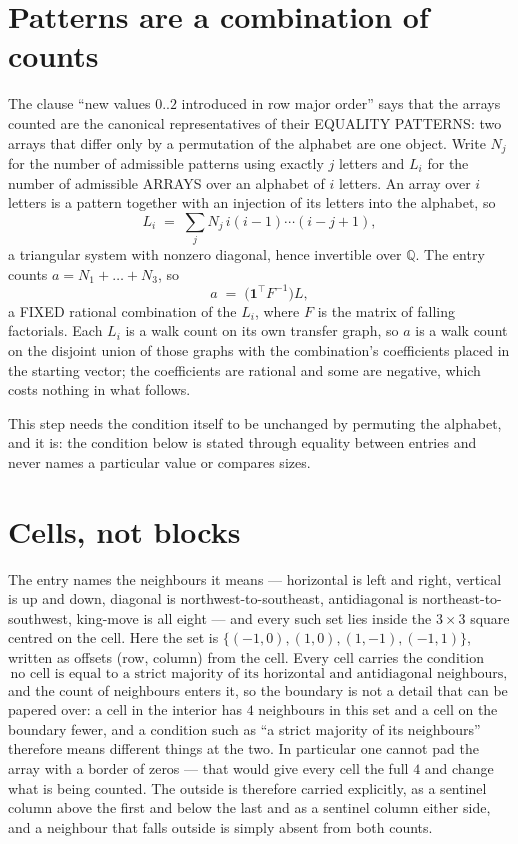 \documentclass[11pt,a4paper]{article}
\theoremstyle{plain}
\theoremstyle{definition}
\begin{document}
\section{Patterns are a combination of counts}

The clause ``new values $0..2$ introduced in row major order'' says that the arrays
counted are the canonical representatives of their EQUALITY PATTERNS: two arrays that differ
only by a permutation of the alphabet are one object. Write $N_j$ for the number of admissible
patterns using exactly $j$ letters and $L_i$ for the number of admissible ARRAYS over an
alphabet of $i$ letters. An array over $i$ letters is a pattern together with an injection of
its letters into the alphabet, so
\[
L_i\;=\;\sum_{j}N_j\,i(i-1)\cdots(i-j+1),
\]
a triangular system with nonzero diagonal, hence invertible over $\mathbb{Q}$. The entry
counts $a=N_1+\dots+N_{3}$, so
\[
a\;=\;\bigl(\mathbf{1}^{\!\top}F^{-1}\bigr)L ,
\]
a FIXED rational combination of the $L_i$, where $F$ is the matrix of falling factorials.
Each $L_i$ is a walk count on its own transfer graph, so $a$ is a walk count on the disjoint
union of those graphs with the combination's coefficients placed in the starting vector; the
coefficients are rational and some are negative, which costs nothing in what follows.

This step needs the condition itself to be unchanged by permuting the alphabet, and it is:
the condition below is stated through equality between entries and never names a particular
value or compares sizes.

\section{Cells, not blocks}

The entry names the neighbours it means --- horizontal is left and right, vertical is up and
down, diagonal is northwest-to-southeast, antidiagonal is northeast-to-southwest, king-move is
all eight --- and every such set lies inside the $3\times3$ square centred on the cell. Here
the set is $\{(-1,0), (1,0), (1,-1), (-1,1)\}$, written as offsets (row, column) from the cell. Every cell carries
the condition
\[
\text{no cell is equal to a strict majority of its horizontal and antidiagonal neighbours},
\]
and the count of neighbours enters it, so the boundary is not a detail that can be papered
over: a cell in the interior has $4$ neighbours in this set and a cell on the boundary
fewer, and a condition such as ``a strict majority of its neighbours'' therefore means
different things at the two. In particular one cannot pad the array with a border of zeros ---
that would give every cell the full $4$ and change what is being counted. The outside is
therefore carried
explicitly, as a sentinel column above the first and below the last and as a sentinel column
either side, and a neighbour that falls outside is simply absent from both counts.
\end{document}
